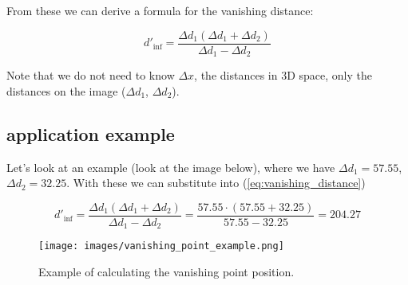 \documentclass{article}
\begin{document}
From these we can derive a formula for the vanishing distance:

\begin{equation}\label{eq:vanishing_distance}
    \boxed{d'_{\text{inf}} = \frac{\Delta d_1 (\Delta d_1 + \Delta d_2)}{\Delta d_1 - \Delta d_2}}
\end{equation}

Note that we do not need to know $\Delta x$, the distances in 3D space, only the distances on the image ($\Delta d_1$, $\Delta d_2$).

\newpage
\subsection{application example}

Let's look at an example (look at the image below), where we have $\Delta d_1 = 57.55$, $\Delta d_2 = 32.25$. With these we can substitute into (\ref{eq:vanishing_distance})

\begin{equation}
    d'_{\text{inf}} = \frac{\Delta d_1 (\Delta d_1 + \Delta d_2)}{\Delta d_1 - \Delta d_2} = \frac{57.55 \cdot (57.55 + 32.25)}{57.55 - 32.25} = 204.27
\end{equation}

\begin{figure}[ht]
 \centering
  \texttt{[image: images/vanishing\_point\_example.png]}
 \caption{Example of calculating the vanishing point position.}
\end{figure}
\end{document}
